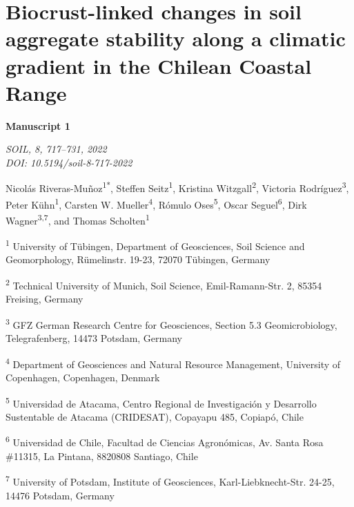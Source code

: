 
\chapter{Biocrust-linked changes in soil aggregate stability along a climatic gradient in the Chilean Coastal Range}
\label{chap:manuscript1} %

\begin{center}
    \textbf{\Large Manuscript 1}

    \vspace{0.3cm}
    \textit{SOIL, 8, 717–731, 2022}\\
    \textit{DOI: 10.5194/soil-8-717-2022}
    
    \vspace{0.5cm}
    
    Nicolás Riveras-Muñoz\textsuperscript{1*}, Steffen Seitz\textsuperscript{1}, Kristina Witzgall\textsuperscript{2}, Victoria Rodríguez\textsuperscript{3}, Peter Kühn\textsuperscript{1}, Carsten W. Mueller\textsuperscript{4}, Rómulo Oses\textsuperscript{5}, Oscar Seguel\textsuperscript{6}, Dirk Wagner\textsuperscript{3,7}, and Thomas Scholten\textsuperscript{1}

    \vspace{0.2cm}
\end{center}

\begin{small}
    \begin{justify}
    \textsuperscript{1} University of Tübingen, Department of Geosciences, Soil Science and Geomorphology, Rümelinstr. 19-23, 72070 Tübingen, Germany
    
    \textsuperscript{2} Technical University of Munich, Soil Science, Emil-Ramann-Str. 2, 85354 Freising, Germany
    
    \textsuperscript{3} GFZ German Research Centre for Geosciences, Section 5.3 Geomicrobiology, Telegrafenberg, 14473 Potsdam, Germany
    
    \textsuperscript{4} Department of Geosciences and Natural Resource Management, University of Copenhagen, Copenhagen, Denmark
    
    \textsuperscript{5} Universidad de Atacama, Centro Regional de Investigación y Desarrollo Sustentable de Atacama (CRIDESAT), Copayapu 485, Copiapó, Chile
    
    \textsuperscript{6} Universidad de Chile, Facultad de Ciencias Agronómicas, Av. Santa Rosa \#11315, La Pintana, 8820808 Santiago, Chile
    
    \textsuperscript{7} University of Potsdam, Institute of Geosciences, Karl-Liebknecht-Str. 24-25, 14476 Potsdam, Germany
    \end{justify}
\end{small}
    
